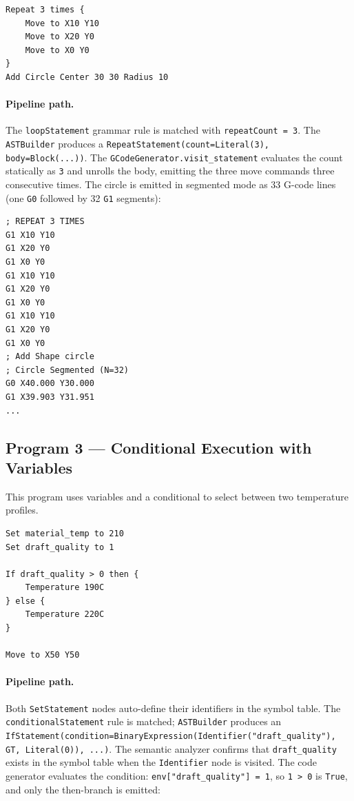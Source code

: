 \begin{verbatim}
Repeat 3 times {
    Move to X10 Y10
    Move to X20 Y0
    Move to X0 Y0
}
Add Circle Center 30 30 Radius 10
\end{verbatim}

\paragraph{Pipeline path.}
The \texttt{loopStatement} grammar rule is matched with \texttt{repeatCount = 3}. The \texttt{ASTBuilder} produces a \texttt{RepeatStatement(count=Literal(3), body=Block(...))}. The \texttt{GCodeGenerator.visit\_statement} evaluates the count statically as \texttt{3} and unrolls the body, emitting the three move commands three consecutive times. The circle is emitted in segmented mode as 33 G-code lines (one \texttt{G0} followed by 32 \texttt{G1} segments):

\begin{verbatim}
; REPEAT 3 TIMES
G1 X10 Y10
G1 X20 Y0
G1 X0 Y0
G1 X10 Y10
G1 X20 Y0
G1 X0 Y0
G1 X10 Y10
G1 X20 Y0
G1 X0 Y0
; Add Shape circle
; Circle Segmented (N=32)
G0 X40.000 Y30.000
G1 X39.903 Y31.951
...
\end{verbatim}

\subsection*{Program 3 --- Conditional Execution with Variables}

This program uses variables and a conditional to select between two temperature profiles.

\begin{verbatim}
Set material_temp to 210
Set draft_quality to 1

If draft_quality > 0 then {
    Temperature 190C
} else {
    Temperature 220C
}

Move to X50 Y50
\end{verbatim}

\paragraph{Pipeline path.}
Both \texttt{SetStatement} nodes auto-define their identifiers in the symbol table. The \texttt{conditionalStatement} rule is matched; \texttt{ASTBuilder} produces an \texttt{IfStatement(condition=BinaryExpression(Identifier("draft\_quality"), GT, Literal(0)), ...)}. The semantic analyzer confirms that \texttt{draft\_quality} exists in the symbol table when the \texttt{Identifier} node is visited. The code generator evaluates the condition: \texttt{env["draft\_quality"] = 1}, so \texttt{1 > 0} is \texttt{True}, and only the then-branch is emitted:

